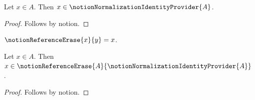 

\begin{proposition}\label{notion_reference_identity_direct}
    Let $x\in A$.
    Then $x\in\notionNormalizationIdentityProvider{A}$.
\end{proposition}
\begin{proof}
    Follows by notion.
\end{proof}

\begin{abbreviation}\label{notion_reference_erase}
    $\notionReferenceErase{x}{y}=x$.
\end{abbreviation}

\begin{proposition}\label{notion_reference_erased_argument}
    Let $x\in A$.
    Then $x\in\notionReferenceErase{A}{\notionNormalizationIdentityProvider{A}}$.
\end{proposition}
\begin{proof}
    Follows by notion.
\end{proof}
